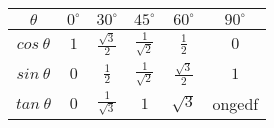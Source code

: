 \begin{table}[H]
\begin{center}
\setlength{\extrarowheight}{2.5pt}

\begin{tabular}{|c|c|c|c|c|c|}\hline
$\theta$
&
${0}^{\circ }$
&
${30}^{\circ }$
&
${45}^{\circ }$
&
${60}^{\circ }$
&
${90}^{\circ }$



\\ \hline
$cos~ \theta $
 &
$1$
&
$\frac{\sqrt{3}}{2}$
&
$\frac{1}{\sqrt{2}}$
&
$\frac{1}{2}$
&
$0$


\\ \hline
$sin~ \theta $
&
$0$
&
$\frac{1}{2} $
&
$\frac{1}{\sqrt{2}}$
&
$\frac{\sqrt{3}}{2}$
&
$1$

\\ \hline
$tan~ \theta $
&
$0$
&
$\frac{1}{\sqrt{3}}$
&
$1$ &
$\sqrt{3}$
&
ongedf


\\ \hline
\end{tabular}
\end{center}
\end{table}

